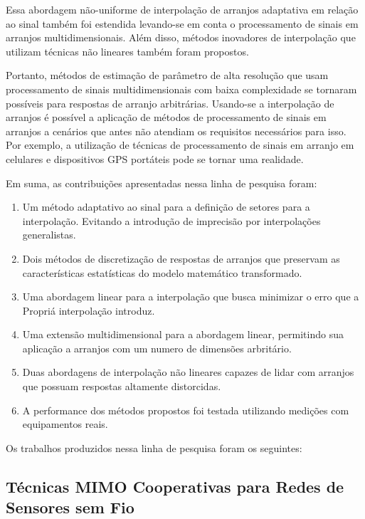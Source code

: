 \documentclass[12pt]{article}
\begin{document}
Essa abordagem não-uniforme de interpolação de arranjos adaptativa em relação ao sinal também foi estendida levando-se em conta o processamento de sinais em arranjos multidimensionais. Além disso, métodos inovadores de interpolação que utilizam técnicas não lineares também foram propostos. 

Portanto, métodos de estimação de parâmetro de alta resolução que usam processamento de sinais multidimensionais com baixa complexidade se tornaram possíveis para respostas de arranjo arbitrárias. Usando-se a interpolação de arranjos é possível a aplicação de métodos de processamento de sinais em arranjos a cenários que antes não atendiam os requisitos necessários para isso. Por exemplo, a utilização de técnicas de processamento de sinais em arranjo em celulares e dispositivos GPS portáteis pode se tornar uma realidade.

Em suma, as contribuições apresentadas nessa linha de pesquisa foram:
\begin{enumerate}
\item Um método adaptativo ao sinal para a definição de setores para a interpolação. Evitando a introdução de imprecisão por interpolações generalistas.
\item Dois métodos de discretização de respostas de arranjos que preservam as características estatísticas do modelo matemático transformado. 
\item Uma abordagem linear para a interpolação que busca minimizar o erro que a Propriá interpolação introduz.
\item Uma extensão multidimensional para a abordagem linear, permitindo sua aplicação a arranjos com um numero de dimensões arbritário. 
\item Duas abordagens de interpolação não lineares capazes de lidar com arranjos que possuam respostas altamente distorcidas.
\item A performance dos métodos propostos foi testada utilizando medições com equipamentos reais.
\end{enumerate}

Os trabalhos produzidos nessa linha de pesquisa foram os seguintes:



\subsection{Técnicas MIMO Cooperativas para Redes de Sensores sem Fio}
\end{document}
